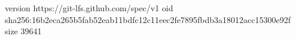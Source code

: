 version https://git-lfs.github.com/spec/v1
oid sha256:16b2eca265b5fab52eab11bdfc12c11eec2fe7895fbdb3a18012acc15300e92f
size 39641
